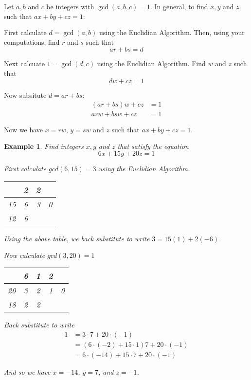 \documentclass[letterpaper, 12pt, oneside]{memoir}
\theoremstyle{mystyle}
\newtheorem{example}[thm]{Example}
\begin{document}
Let $a, b$ and $c$ be integers with $\gcd(a,b,c) = 1$. In general, to find $x,
y$ and $z$ such that $ax + by + cz = 1$:

First calculate $d = \gcd(a,b)$ using the Euclidian Algorithm. Then, using your
computations, find $r$ and $s$ such that 
\[ ar + bs = d \]

Next calcuate $1 = \gcd(d, c)$ using the Euclidian Algorithm. Find $w$ and
$z$ such that
\[dw + cz = 1\]

Now subsitute $d = ar + bs$:
\begin{align*}
    (ar + bs)w + cz &= 1  \\
    arw + bsw + cz  &= 1
\end{align*}

Now we have $x = rw$, $y = sw$ and $z$ such that $ax + by + cz = 1$.

\begin{example}
    Find integers $x, y$ and $z$ that satisfy the equation
    \[ 6x + 15y + 20z = 1\]
    
    First calculate $gcd(6,15) = 3$ using the Euclidian Algorithm.
    \begin{table}[H]
    \centering
    \begin{tabular}{c|c|c|c}
            & 2  & 2  &    \\ \hline
        15  & 6  & 3  & 0  \\ \hline
        12  & 6  &    &
    \end{tabular}
    \end{table}

    Using the above table, we back substitute to write $3 = 15(1) + 2(-6)$.
    
    Now calculate $gcd(3,20) = 1$
    \begin{table}[H]
    \centering 
    \begin{tabular}{c|c|c|c|c}
            & 6  & 1  & 2  &    \\ \hline
        20  & 3  & 2  & 1  & 0  \\ \hline
        18  & 2  & 2  &    &
    \end{tabular}
    \end{table}
    
    Back substitute to write 
    \begin{align*}
        1 &= 3 \cdot 7 + 20 \cdot (-1) \\
          &= (6 \cdot (-2) + 15 \cdot 1)7 + 20 \cdot (-1) \\
          &= 6 \cdot (-14) + 15 \cdot 7 + 20 \cdot (-1)
    \end{align*}
    
    And so we have $x = -14$, $y = 7$, and $z=-1$.
\end{example}
\end{document}
